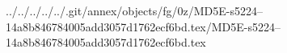 ../../../../../.git/annex/objects/fg/0z/MD5E-s5224--14a8b846784005add3057d1762ecf6bd.tex/MD5E-s5224--14a8b846784005add3057d1762ecf6bd.tex